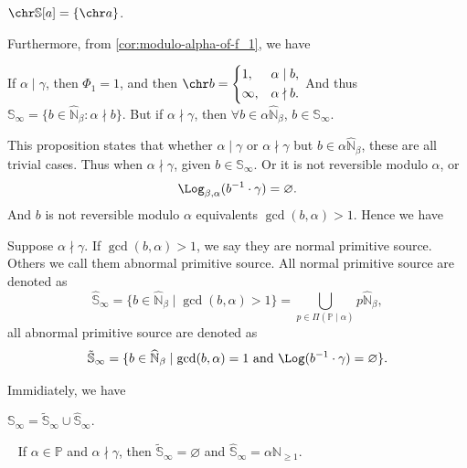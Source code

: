 \begin{proposition}
    $\chr \mathbb{S}[a] = \{\chr a\}$.
\end{proposition}
Furthermore, from \cref{cor:modulo-alpha-of-f_1}, we have
\begin{proposition}
    If $\alpha \mid \gamma$, then $\Phi_1 = 1$, and then $\chr b = \left\{\begin{aligned}
        &1, &&\alpha\mid b, \\
        &\infty, &&\alpha\nmid b.
    \end{aligned}\right.$\newline
    And thus $\mathbb{S}_{\infty} = \{b \in \widehat{\mathbb{N}}_\beta: \alpha\nmid b\}$.
    But if $\alpha \nmid \gamma$, then $\forall b\in\alpha\widehat{\mathbb{N}}_\beta$, $b \in \mathbb{S}_{\infty}$.
\end{proposition}

This proposition states that whether $\alpha \mid \gamma$ or $\alpha \nmid \gamma$ but $b \in \alpha\widehat{\mathbb{N}}_\beta$, these are all trivial cases. Thus when $\alpha \nmid \gamma$, given $b \in \mathbb{S}_{\infty}$. Or it is not reversible modulo $\alpha$, or
\[\Log_{\beta, \alpha}(b^{-1} \cdot \gamma) = \varnothing. \]
And $b$ is not reversible modulo $\alpha$ equivalents $\gcd(b, \alpha) > 1$. Hence we have
\begin{definition}
    Suppose $\alpha \nmid \gamma$. If $\gcd(b, \alpha) > 1$, we say they are normal primitive source.
    Others we call them abnormal primitive source.
    All normal primitive source are denoted as 
    \[\hat{\mathbb{S}}_{\infty} = \{b \in \widehat{\mathbb{N}}_{\beta} \mid \gcd(b, \alpha) > 1\} = \bigcup_{p\in\Pi(\mathbb{P}\mid\alpha)} p\widehat{\mathbb{N}}_{{\beta}}, \]
    all abnormal primitive source are denoted as
    \[ \tilde{\mathbb{S}}_{\infty} = \{b \in \widehat{\mathbb{N}}_{\beta} \mid \gcd(b, \alpha) = 1 \text{ and } \Log(b^{-1}\cdot\gamma) = \varnothing\}. \]
\end{definition}
Immidiately, we have
\begin{proposition}
    $\mathbb{S}_{\infty} = \tilde{\mathbb{S}}_{\infty} \cup \hat{\mathbb{S}}_{\infty}$.
\end{proposition}
\begin{proposition}~\label{prop:primitive-source-of-simple-collatz-system}
    If $\alpha\in\mathbb{P}$ and $\alpha\nmid\gamma$, then $\tilde{\mathbb{S}}_{\infty} = \varnothing$ and $\hat{\mathbb{S}}_{\infty} = \alpha\mathbb{N}_{\ge 1}$.
\end{proposition}
